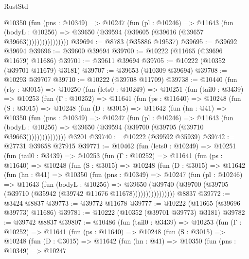 \begin{lexlean}{RustStd}
\begin{coremodule}
                    @10350
                      (fun (pns : @10349) =>
                      @10247
                        (fun (pl : @10246) =>
                        @11643
                          (fun (bodyL : @10256) =>
                          @39650 (@39594 (@39605 (@39616 (@39657 @39663))))))))))))))))
@39694 := @8783 (@35886 @19537)
@39695 := @39692 @39694
@39696 := @39600 @39694
@39700 := @10222 (@11665 (@39696 @11679) @11686)
@39701 := @39611 @39694
@39705 := @10222 (@10352 (@39701 @11679) @3181)
@39707 := @39653 (@10309 @39694)
@39708 := @10293 @39707
@39710 := @10222 (@39708 @11709)
@39738 := @10440
    (fun (rty : @3015) =>
    @10250
      (fun (lets0 : @10249) =>
      @10251
        (fun (tail0 : @3439) =>
        @10253
          (fun (Γ : @10252) =>
          @11641
            (fun (ps : @11640) =>
            @10248
              (fun (S : @3015) =>
              @10248
                (fun (D : @3015) =>
                @11642
                  (fun (hn : @41) =>
                  @10350
                    (fun (pns : @10349) =>
                    @10247
                      (fun (pl : @10246) =>
                      @11643
                        (fun (bodyL : @10256) =>
                        @39650 (@39594 (@39700 (@39705 (@39710 @39663)))))))))))))))
    @3201
@39740 := @10222 (@39592 @35939)
@39742 := @27731 @39658 @27915
@39771 := @10462
    (fun (lets0 : @10249) =>
    @10251
      (fun (tail0 : @3439) =>
      @10253
        (fun (Γ : @10252) =>
        @11641
          (fun (ps : @11640) =>
          @10248
            (fun (S : @3015) =>
            @10248
              (fun (D : @3015) =>
              @11642
                (fun (hn : @41) =>
                @10350
                  (fun (pns : @10349) =>
                  @10247
                    (fun (pl : @10246) =>
                    @11643
                      (fun (bodyL : @10256) =>
                      @39650
                        (@39740
                          (@39700 (@39705 (@39710 (@35942 (@39742 @11676 @11678))))))))))))))))
    @8837
@39772 := @3424 @8837
@39773 := @39772 @11678
@39777 := @10222 (@11665 (@39696 @39773) @11686)
@39781 := @10222 (@10352 (@39701 @39773) @3181)
@39782 := @39742 @8837
@39807 := @10486
    (fun (tail0 : @3439) =>
    @10253
      (fun (Γ : @10252) =>
      @11641
        (fun (ps : @11640) =>
        @10248
          (fun (S : @3015) =>
          @10248
            (fun (D : @3015) =>
            @11642
              (fun (hn : @41) =>
              @10350
                (fun (pns : @10349) =>
                @10247

\end{coremodule}
\end{lexlean}
